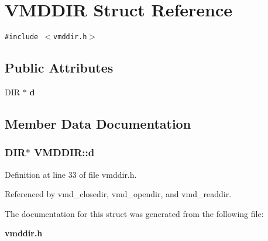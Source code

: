 \section{VMDDIR  Struct Reference}
\label{structVMDDIR}
{\tt \#include $<$vmddir.h$>$}

\subsection*{Public Attributes}
\begin{CompactItemize}
\item 
DIR $\ast$ {\bf d}
\end{CompactItemize}


\subsection{Member Data Documentation}
\subsubsection{\setlength{\rightskip}{0pt plus 5cm}DIR$\ast$ VMDDIR::d}\label{structVMDDIR_m0}




Definition at line 33 of file vmddir.h.

Referenced by vmd\_\-closedir, vmd\_\-opendir, and vmd\_\-readdir.

The documentation for this struct was generated from the following file:\begin{CompactItemize}
\item 
{\bf vmddir.h}\end{CompactItemize}
